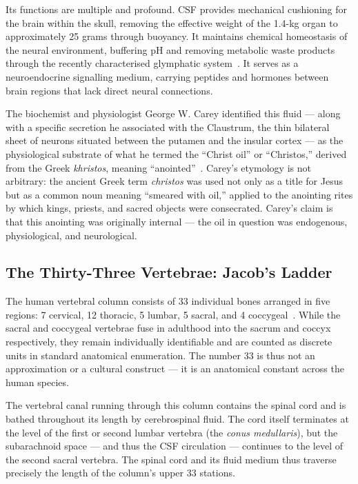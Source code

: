 \documentclass[12pt, a4paper]{article}
\begin{document}
Its functions are multiple and profound. CSF provides mechanical cushioning
for the brain within the skull, removing the effective weight of the 1.4-kg
organ to approximately 25 grams through buoyancy. It maintains chemical
homeostasis of the neural environment, buffering pH and removing metabolic
waste products through the recently characterised glymphatic
system~\autocite[1291]{gray2016}. It serves as a neuroendocrine signalling
medium, carrying peptides and hormones between brain regions that lack direct
neural connections.

The biochemist and physiologist George W. Carey identified this fluid — along
with a specific secretion he associated with the Claustrum, the thin bilateral
sheet of neurons situated between the putamen and the insular cortex — as the
physiological substrate of what he termed the ``Christ oil'' or ``Christos,''
derived from the Greek \emph{khristos}, meaning ``anointed''~\autocite{carey1920}.
Carey's etymology is not arbitrary: the ancient Greek term \emph{christos} was
used not only as a title for Jesus but as a common noun meaning ``smeared with
oil,'' applied to the anointing rites by which kings, priests, and sacred
objects were consecrated. Carey's claim is that this anointing was originally
internal — the oil in question was endogenous, physiological, and
neurological.

\subsection{The Thirty-Three Vertebrae: Jacob's Ladder}

The human vertebral column consists of 33 individual bones arranged in five
regions: 7 cervical, 12 thoracic, 5 lumbar, 5 sacral, and 4
coccygeal~\autocite[720]{gray2016}. While the sacral and coccygeal vertebrae
fuse in adulthood into the sacrum and coccyx respectively, they remain
individually identifiable and are counted as discrete units in standard
anatomical enumeration. The number 33 is thus not an approximation or a
cultural construct — it is an anatomical constant across the human species.

The vertebral canal running through this column contains the spinal cord and
is bathed throughout its length by cerebrospinal fluid. The cord itself
terminates at the level of the first or second lumbar vertebra (the
\emph{conus medullaris}), but the subarachnoid space — and thus the CSF
circulation — continues to the level of the second sacral vertebra. The
spinal cord and its fluid medium thus traverse precisely the length of the
column's upper 33 stations.
\end{document}

